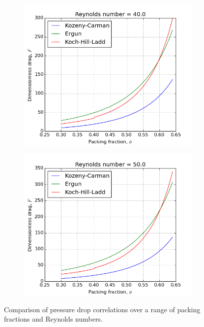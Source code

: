 \begin{figure}[!ht]
    \begin{subfigure}[b]{0.45\textwidth}
        \centering
        \includegraphics[width=\textwidth]{figures/pressure-drop-correlations/Re40.png}
    \end{subfigure}
    \begin{subfigure}[b]{0.45\textwidth}
        \centering
        \includegraphics[width=\textwidth]{figures/pressure-drop-correlations/Re50.png}
    \end{subfigure}
    \caption{Comparison of pressure drop correlations over a range of packing fractions and Reynolds numbers.}
\label{fig:p-drop-correlations}
\end{figure}

